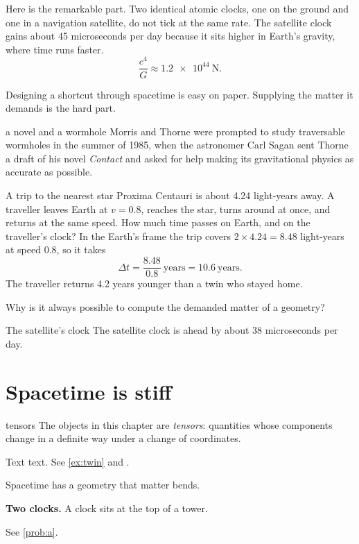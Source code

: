 \documentclass[paper=letter,fontsize=10pt,twoside=true,twocolumn=true,open=right,chapterprefix=false,numbers=noenddot]{scrbook}
\begin{document}
Here is the remarkable part. Two identical atomic clocks, one on the ground and one in a navigation satellite, do not tick at the same rate. The satellite clock gains about 45 microseconds per day because it sits higher in Earth's gravity, where time runs faster.
\begin{equation}
  \frac{c^{4}}{G} \approx \SI{1.2e44}{\newton}.
  \label{eq:stiffness}
\end{equation}
\begin{keyidea}
Designing a shortcut through spacetime is easy on paper. Supplying the matter it demands is the hard part.
\end{keyidea}
\begin{history}{a novel and a wormhole}
Morris and Thorne were prompted to study traversable wormholes in the summer of 1985, when the astronomer Carl Sagan sent Thorne a draft of his novel \emph{Contact} and asked for help making its gravitational physics as accurate as possible.
\end{history}
\begin{example}{A trip to the nearest star}\label{ex:twin}
Proxima Centauri is about 4.24 light-years away. A traveller leaves Earth at $v = 0.8$, reaches the star, turns around at once, and returns at the same speed. How much time passes on Earth, and on the traveller's clock?
\solution In the Earth's frame the trip covers $2 \times 4.24 = 8.48$ light-years at speed $0.8$, so it takes
\begin{equation*}
  \Delta t = \frac{8.48}{0.8}\ \text{years} = 10.6\ \text{years}.
\end{equation*}
\discussion The traveller returns 4.2 years younger than a twin who stayed home.
\end{example}
\begin{checkpoint}
Why is it always possible to compute the demanded matter of a geometry?
\end{checkpoint}
\begin{revisited}{The satellite's clock}
The satellite clock is ahead by about 38 microseconds per day.
\end{revisited}
\section{Spacetime is stiff}
\begin{deeper}{tensors}
The objects in this chapter are \emph{tensors}: quantities whose components change in a definite way under a change of coordinates.
\end{deeper}
Text text. See \cref{ex:twin} and .
\begin{chaptersummary}
\item Spacetime has a geometry that matter bends.
\end{chaptersummary}
\begin{problems}
\item {} \textbf{Two clocks.} A clock sits at the top of a tower.\label{prob:a}
\item {} See \cref{prob:a}.
\end{problems}
\end{document}

